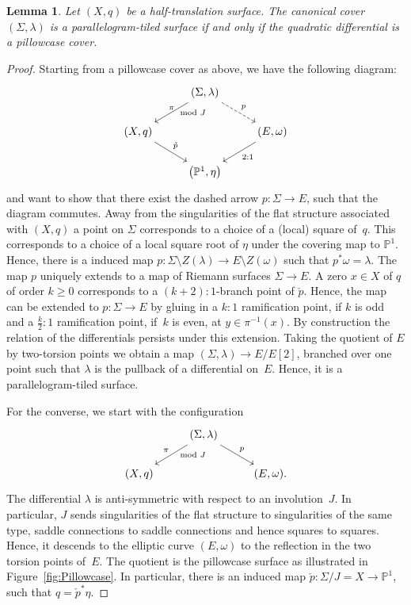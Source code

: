 \documentclass[pdftex]{sigma}
\numberwithin{equation}{section}
\newtheorem{lemm}[theo]{Lemma}
\theoremstyle{definition}
\renewcommand{\to}{\rightarrow}
\newcommand{\PP}{\mathbb{P}}
\begin{document}
\begin{lemm}\label{lemm:pillow} Let $(X,q)$ be a half-trans\-lation surface. The canonical cover $(\Sigma,\lambda)$ is a para\-llelo\-gram-tiled surface if and only if the quadratic differential is a pillowcase cover.
\end{lemm}
\begin{proof}
 Starting from a pillowcase cover as above, we have the following diagram:
\[	\begin{tikzcd}
		& (\Sigma,\lambda) \ar[rd,"p",dashed] \ar[ld,"\pi" above, "\mod J" right]& \\ (X,q) \ar[rd,"\check{p}"] & & (E, \omega) \ar[ld,"2:1"] \\ & \bigl(\PP^1,\eta\bigr) &
\end{tikzcd}
\]
and want to show that there exist the dashed arrow $p\colon \Sigma \to E$, such that the diagram commutes. Away from the singularities of the flat structure associated with $(X,q)$ a point on $\Sigma$ corresponds to a choice of a (local) square of~$q$. This corresponds to a choice of a local square root of $\eta$ under the covering map to $\PP^1$. Hence, there is a induced map $p\colon \Sigma\setminus Z(\lambda) \to E \setminus Z(\omega)$ such that $p^*\omega=\lambda$.
The map $p$ uniquely extends to a map of Riemann surfaces $\Sigma \to E$. A zero $x \in X$ of $q$ of order $k\geq 0$ corresponds to a $(k+2):1$-branch point of $\check{p}$. Hence, the map can be extended to $p\colon \Sigma \to E$ by gluing in a $k:1$ ramification point, if $k$ is odd and a $\frac{k}{2}:1$ ramification point, if~$k$ is even, at $y \in \pi^{-1}(x)$.
 By construction the relation of the differentials persists under this extension. Taking the quotient of $E$ by two-torsion points we obtain a map $(\Sigma,\lambda) \to E/E[2]$, branched over one point such that $\lambda$ is the pullback of a differential on~$E$. Hence, it is a parallelogram-tiled surface.

For the converse, we start with the configuration
\[ 	\begin{tikzcd}
		& (\Sigma,\lambda) \ar[rd,"p"] \ar[ld,"\pi" above left, "\mod J" right]& \\ (X,q) & & (E, \omega).
	\end{tikzcd}
\]
The differential $\lambda$ is anti-symmetric with respect to an involution~$J$. In particular, $J$ sends singularities of the flat structure to singularities of the same type, saddle connections to saddle connections and hence squares to squares. Hence, it descends to the elliptic curve $(E,\omega)$ to the reflection in the two torsion points of~$E$. The quotient is the pillowcase surface as illustrated in Figure~\ref{fig:Pillowcase}. In particular, there is an induced map $\check{p}\colon \Sigma/J=X \to \PP^1$, such that $q=\check{p}^*\eta$.
\end{proof}
\end{document}
